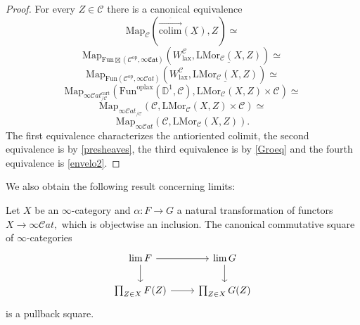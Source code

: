 \documentclass[10pt,oneside]{article}
\numberwithin{equation}{section} %
\numberwithin{figure}{section} %
\theoremstyle{plain}
\theoremstyle{definition}
\newcommand{\bD}{{\mathbb D}}
\newcommand{\mC}{{\mathcal C}}
\renewcommand{\L}{{\mathrm L}}
\newcommand{\op}{\mathrm{op}}
\newcommand{\colim}{\mathrm{colim}}
\newcommand{\Fun}{\mathrm{Fun}}
\newcommand{\cart}{{\mathrm{cart}}}
\newcommand{\lax}{{\mathrm{lax}}}
\newcommand{\oplax}{{\mathrm{oplax}}}
\newcommand{\Mor}{{\mathrm{Mor}}}
\newcommand{\map}{\mathrm{Map}}
\newcommand{\scat}{\mathcal{C}\mathit{at}}
\newcommand{\fcat}{\mathfrak{Cat}}
\begin{document}
\begin{proof}
For every $Z \in \mC$ there is a canonical equivalence
$$ \map_\mC(\overset{\bar{\to}}{\colim}(\underline{X}),Z) \simeq $$$$ \map_{\Fun\boxtimes(\mC^\op, \infty\fcat)}(W^{\mC}_\lax,\underline{\L\Mor_\mC(X,Z)}) \simeq $$
$$ \map_{{{\Fun}}(\mC^\op, \infty\scat)}(W^{\mC}_\lax,\underline{\L\Mor_\mC(X,Z)}) \simeq  $$$$ \map_{\infty\scat^\cart_{/\mC}}(\Fun^\oplax(\bD^1,\mC),\L\Mor_\mC(X,Z)\times \mC) \simeq $$$$ \map_{\infty\scat_{/ \mC}}(\mC,\L\Mor_\mC(X,Z) \times \mC) \simeq $$$$ \map_{\infty\scat}(\mC,\L\Mor_\mC(X,Z)).$$
The first equivalence characterizes the antioriented colimit,
the second equivalence is by \cref{presheaves},
the third equivalence is by \cref{Groeq} and the fourth equivalence is \cref{envelo2}.
\end{proof}

We also obtain the following result concerning limits:

\begin{proposition}

Let $X$ be an $\infty$-category and $\alpha: F \to G$ a natural transformation of functors $X \to \infty\scat,$ which is objectwise an inclusion.
The canonical commutative square of $\infty$-categories
$$ \begin{tikzcd}
\lim F \ar{r}{} \ar{d} & \lim G \ar{d}{} \\
\prod_{Z \in X} F(Z)  \ar{r}[swap]{} & \prod_{Z \in X} G(Z)
\end{tikzcd}$$
is a pullback square.

\end{proposition}
\end{document}
